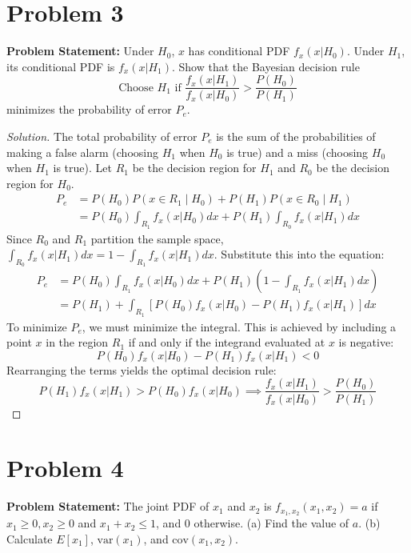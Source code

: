 \documentclass{article}
\begin{document}
\vspace{1cm}

\section*{Problem 3}
\textbf{Problem Statement:}
Under $H_0$, $x$ has conditional PDF $f_x(x|H_0)$. Under $H_1$, its conditional PDF is $f_x(x|H_1)$. Show that the Bayesian decision rule
\[
	\text{Choose } H_1 \text{ if } \frac{f_x(x|H_1)}{f_x(x|H_0)} > \frac{P(H_0)}{P(H_1)}
\]
minimizes the probability of error $P_e$.

\begin{proof}[Solution]
	The total probability of error $P_e$ is the sum of the probabilities of making a false alarm (choosing $H_1$ when $H_0$ is true) and a miss (choosing $H_0$ when $H_1$ is true). Let $R_1$ be the decision region for $H_1$ and $R_0$ be the decision region for $H_0$. 
	\begin{align*}
		P_e &= P(H_0) P(x \in R_1 \mid H_0) + P(H_1) P(x \in R_0 \mid H_1) \\
		&= P(H_0) \int_{R_1} f_x(x|H_0) dx + P(H_1) \int_{R_0} f_x(x|H_1) dx
	\end{align*}
	Since $R_0$ and $R_1$ partition the sample space, $\int_{R_0} f_x(x|H_1) dx = 1 - \int_{R_1} f_x(x|H_1) dx$. Substitute this into the equation:
	\begin{align*}
		P_e &= P(H_0) \int_{R_1} f_x(x|H_0) dx + P(H_1) \left(1 - \int_{R_1} f_x(x|H_1) dx\right) \\
		&= P(H_1) + \int_{R_1} \left[ P(H_0) f_x(x|H_0) - P(H_1) f_x(x|H_1) \right] dx
	\end{align*}
	To minimize $P_e$, we must minimize the integral. This is achieved by including a point $x$ in the region $R_1$ if and only if the integrand evaluated at $x$ is negative:
	\[
		P(H_0) f_x(x|H_0) - P(H_1) f_x(x|H_1) < 0
	\]
	Rearranging the terms yields the optimal decision rule:
	\[
		P(H_1) f_x(x|H_1) > P(H_0) f_x(x|H_0) \implies \frac{f_x(x|H_1)}{f_x(x|H_0)} > \frac{P(H_0)}{P(H_1)}
	\]
	\end{proof}

\vspace{1cm}

\section*{Problem 4}
\textbf{Problem Statement:}
The joint PDF of $x_1$ and $x_2$ is $f_{x_1,x_2}(x_1,x_2) = a$ if $x_1 \ge 0, x_2 \ge 0$ and $x_1+x_2 \le 1$, and $0$ otherwise.
(a) Find the value of $a$.
(b) Calculate $E[x_1]$, $\text{var}(x_1)$, and $\text{cov}(x_1,x_2)$.
\end{document}

